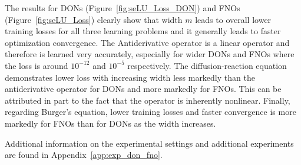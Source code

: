 The results for DONs (Figure~\ref{fig:seLU_Loss_DON}) and FNOs (Figure~\ref{fig:seLU_Loss})
clearly show that 
width $m$  leads to overall lower training losses for all three learning problems and it generally leads to faster optimization convergence.
%
%
The Antiderivative operator 
is a linear operator and therefore is learned very accurately, especially for wider DONs and FNOs where the loss is around $10^{-12}$ and $10^{-5}$ respectively. 
%
The diffusion-reaction equation %
demonstrates lower loss with increasing width %
less markedly than the antiderivative operator for DONs and more markedly for FNOs. This can be attributed in part to the fact that the operator is inherently nonlinear. 
Finally, regarding Burger's equation,
lower training losses and faster convergence is more markedly for FNOs than for DONs as the width increases. 

Additional information on the experimental settings and additional experiments are found in Appendix~\ref{app:exp_don_fno}.
